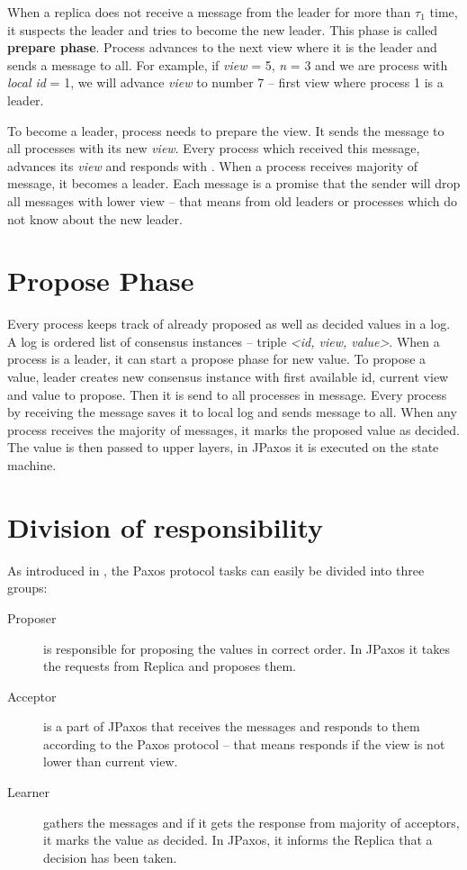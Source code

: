 When a replica does not receive a message from the leader for more than $\tau_1$ time, it suspects the leader and tries to become the new leader. This phase is called \textbf{prepare phase}. Process advances to the next view where it is the leader and sends a \prepare message to all. For example, if \textit{view} = 5, \textit{n} = 3 and we are process with \textit{local id} = 1, we will advance \textit{view} to number 7 -- first view where process 1 is a leader.

To become a leader, process needs to prepare the view. It sends the \prepare message to all processes with its new \textit{view}. Every process which received this message, advances its \textit{view} and responds with \prepareOK[]. When a process receives majority of \prepareOK message, it becomes a leader. Each \prepareOK message is a promise that the sender will drop all messages with lower view -- that means from old leaders or processes which do not know about the new leader.

\section{Propose Phase}

Every process keeps track of already proposed as well as decided values in a log. A log is ordered list of consensus instances -- triple \textit{<id, view, value>}. When a process is a leader, it can start a propose phase for new value. To propose a value, leader creates new consensus instance with first available id, current view and value to propose. Then it is send to all processes in \propose message. Every process by receiving the \propose message saves it to local log and sends \accept message to all. When any process receives the majority of \accept messages, it marks the proposed value as decided. The value is then passed to upper layers, in JPaxos it is executed on the state machine.

\section{Division of responsibility}

As introduced in \cite{Lam01}, the Paxos protocol tasks can easily be divided into three groups:
\begin{description}
 \item[Proposer] is responsible for proposing the values in correct order. In JPaxos it takes the requests from Replica and proposes them.
 
 \item[Acceptor] is a part of JPaxos that receives the \propose messages and responds to them according to the Paxos protocol -- that means responds if the view is not lower than current view.
 
 \item[Learner] gathers the \accept messages and if it gets the response from majority of acceptors, it marks the value as decided. In JPaxos, it informs the Replica that a decision has been taken.
\end{description}

